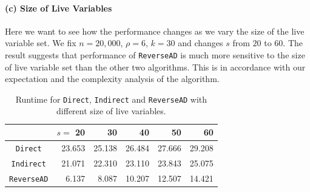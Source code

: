 \documentclass[final,leqno,onefignum,onetabnum]{siamart}
\begin{document}
\paragraph{(c) Size of Live Variables} 
Here we want to see how the performance changes as we vary the size of the live variable set.
We fix $n = 20,000$, $\rho = 6$, $k = 30$ and changes $s$ from $20$ to $60$. The result suggests that performance of {\tt ReverseAD} is much more sensitive to the size of live variable set than the other two algorithms. This is in accordance with our expectation and the complexity analysis of the algorithm.
\begin{table}[htbp]
\begin{center}
\begin{tabular}{ | c | r | r | r | r | r |}
\hline
& $s=$ 20 & 30 & 40 & 50 & 60 \\
\hline
{\tt Direct} & 23.653 & 25.138 & 26.484 & 27.666 & 29.208\\
{\tt Indirect} & 21.071 & 22.310 & 23.110 & 23.843 & 25.075\\
{\tt ReverseAD} & 6.137 & 8.087 & 10.207 & 12.507 & 14.421\\
\hline 
\end{tabular}
\caption{Runtime for {\tt Direct}, {\tt Indirect} and {\tt ReverseAD} with different size of live variables.}
\label{tab:live}
\end{center}
\end{table}
\end{document}
